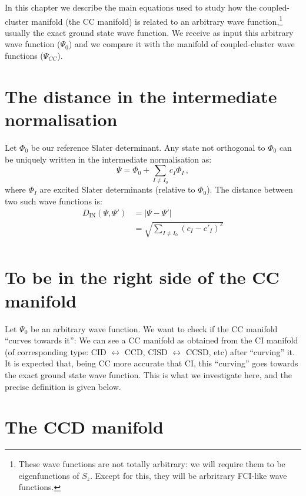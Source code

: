 In this chapter we describe the main equations used to study how the coupled-cluster manifold
(the CC manifold)
is related to an arbitrary wave function,\footnote{
  These wave functions are not totally arbitrary:
  we will require them to be eigenfunctions of $S_z$.
  Except for this, they will be arbritrary FCI-like wave functions.
  }
usually the exact ground state wave function.
We receive as input this arbitrary wave function ($\Psi_0$) and we compare it with the manifold
of coupled-cluster wave functions ($\Psi_{CC}$).

\section{The distance in the intermediate normalisation}

Let $\Phi_0$ be our reference Slater determinant.
Any state not orthogonal to $\Phi_0$ can be uniquely written in the intermediate normalisation as:
\begin{equation}
  \Psi = \Phi_0 + \sum_{I \ne I_0} c_I \Phi_I\,,
\end{equation}
where $\Phi_I$ are excited Slater determinants (relative to $\Phi_0$).
The distance between two such wave functions is:
\begin{equation}
  \begin{split}
    D_\text{IN}(\Psi,\Psi') &= |\Psi - \Psi'|\\
    &=\sqrt{\sum_{I \ne I_0} (c_I - c'_I)^2 }\\
  \end{split}
\end{equation}

\section{To be in the right side of the CC manifold}

Let $\Psi_0$ be an arbitrary wave function.
We want to check if the CC manifold ``curves towards it'':
We can see a CC  manifold as obtained from the CI manifold (of corresponding type:
CID $\leftrightarrow$ CCD, CISD $\leftrightarrow$ CCSD, etc)
after ``curving'' it.
It is expected that, being CC more accurate that CI, this ``curving'' goes towards the exact
ground state wave function.
This is what we investigate here, and the precise definition is given below.

\section{The CCD manifold}

